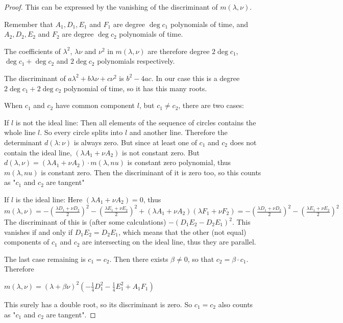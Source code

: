 \documentclass[a4paper]{article}
\begin{document}
\begin{proof}
This can be expressed by the vanishing of the discriminant of $m(\lambda,\nu)$.

Remember that $A_1, D_1, E_1$ and $F_1$ are degree $\deg c_1$ polynomials of time, and $A_2, D_2, E_2$ and $F_2$ are degree $\deg c_2$ polynomials of time.

The coefficients of $\lambda^2$, $\lambda\nu$ and $\nu^2$ in $m(\lambda,\nu)$ are therefore degree $2\deg c_1$, $\deg c_1+\deg c_2$ and $2\deg c_2$ polynomials respectively.

The discriminant of $a\lambda^2+b\lambda\nu+c\nu^2$ is $b^2-4ac$. In our case this is a degree $2\deg c_1 + 2\deg c_2$ polynomial of time, so it has this many roots.

When $c_1$ and $c_2$ have common component $l$, but $c_1\ne c_2$, there are two cases:

If $l$ is not the ideal line: Then all elements of the sequence of circles contains the whole line $l$. So every circle splits into $l$ and another line. Therefore the determinant $d(\lambda:\nu)$ is always zero. But since at least one of $c_1$ and $c_2$ does not contain the ideal line, $(\lambda A_1+\nu A_2)$ is not constant zero. But $d(\lambda,\nu)=(\lambda A_1+\nu A_2)\cdot m(\lambda,nu)$ is constant zero polynomial, thus $m(\lambda,nu)$ is constant zero. Then the discriminant of it is zero too, so this counts as "$c_1$ and $c_2$ are tangent"

If $l$ is the ideal line: Here $(\lambda A_1+\nu A_2)=0$, thus $$m(\lambda,\nu)=-\left(\tfrac{\lambda D_1+\nu D_2}{2}\right)^2-\left(\tfrac{\lambda E_1+\nu E_2}{2}\right)^2+(\lambda A_1+\nu A_2)(\lambda F_1+\nu F_2)=-\left(\tfrac{\lambda D_1+\nu D_2}{2}\right)^2-\left(\tfrac{\lambda E_1+\nu E_2}{2}\right)^2$$
The discriminant of this is (after some calculations) $-(D_1E_2-D_2E_1)^2$. This vanishes if and only if $D_1E_2=D_2E_1$, which means that the other (not equal) components of $c_1$ and $c_2$ are intersecting on the ideal line, thus they are parallel.

The last case remaining is $c_1=c_2$. Then there exists $\beta \ne 0$, so that $c_2=\beta \cdot c_1$. Therefore

$m(\lambda,\nu)=(\lambda+\beta\nu)^2(-\frac{1}{4}D_1^2-\frac{1}{4}E_1^2+A_1F_1)$

This surely has a double root, so its discriminant is zero. So $c_1=c_2$ also counts as "$c_1$ and $c_2$ are tangent".



\end{proof}
\end{document}
